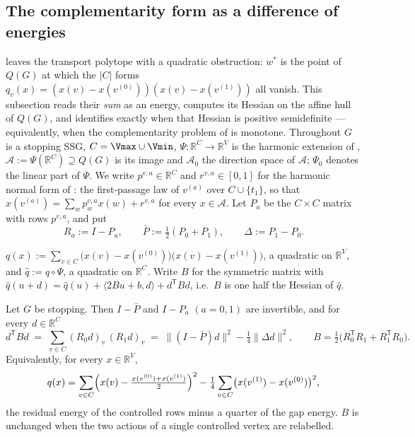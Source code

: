 
\subsection{The complementarity form as a difference of energies}\label{vr:sec}

 leaves the transport polytope with a
quadratic obstruction: $w^{\ast}$ is the point of $Q(G)$ at which the
$|C|$ forms $q_v(x)=(x(v)-x(v^{(0)}))(x(v)-x(v^{(1)}))$ all vanish. This
subsection reads their \emph{sum} as an energy, computes its Hessian on
the affine hull of $Q(G)$, and identifies exactly when that Hessian is
positive semidefinite --- equivalently, when the complementarity problem
of  is monotone. Throughout $G$ is a stopping SSG,
$C=\Vmax\cup\Vmin$, $\Psi\colon\mathbb R^{C}\to\mathbb R^{V}$ is the
harmonic extension of , $\mathcal A:=\Psi(\mathbb
R^{C})\supseteq Q(G)$ is its image and $\mathcal A_0$ the direction space
of $\mathcal A$; $\Psi_0$ denotes the linear part of $\Psi$. We write
$p^{v,a}\in\mathbb R^{C}$ and $r^{v,a}\in[0,1]$ for the harmonic normal
form of : the first-passage law of $v^{(a)}$ over
$C\cup\{t_1\}$, so that $x(v^{(a)})=\sum_{w}p^{v,a}_wx(w)+r^{v,a}$ for
every $x\in\mathcal A$. Let $P_a$ be the $C\times C$ matrix with rows
$p^{v,a}$, and put
\[
  R_a:=I-P_a,\qquad \bar P:=\tfrac12(P_0+P_1),\qquad \Delta:=P_1-P_0 .
\]

\begin{definition}\label{vr:def-form}
$q(x):=\sum_{v\in C}\bigl(x(v)-x(v^{(0)})\bigr)\bigl(x(v)-x(v^{(1)})\bigr)$,
a quadratic on $\mathbb R^{V}$, and $\widehat q:=q\circ\Psi$, a quadratic
on $\mathbb R^{C}$. Write $B$ for the symmetric matrix with
$\widehat q(u+d)=\widehat q(u)+\langle 2Bu+b,d\rangle+d^{\mathsf T}Bd$,
i.e.\ $B$ is one half the Hessian of $\widehat q$.
\end{definition}

\begin{lemma}\label{vr:hessian}
Let $G$ be stopping. Then $I-\bar P$ and $I-P_a$ $(a=0,1)$ are invertible,
and for every $d\in\mathbb R^{C}$
\[
  d^{\mathsf T}Bd
  \;=\;\sum_{v\in C}(R_0d)_v\,(R_1d)_v
  \;=\;\bigl\|(I-\bar P)d\bigr\|^{2}-\tfrac14\bigl\|\Delta d\bigr\|^{2},
  \qquad
  B=\tfrac12\bigl(R_0^{\mathsf T}R_1+R_1^{\mathsf T}R_0\bigr).
\]
Equivalently, for every $x\in\mathbb R^{V}$,
\[
  q(x)=\sum_{v\in C}\Bigl(x(v)-\tfrac{x(v^{(0)})+x(v^{(1)})}2\Bigr)^{2}
       -\tfrac14\sum_{v\in C}\bigl(x(v^{(1)})-x(v^{(0)})\bigr)^{2},
\]
the residual energy of the controlled rows minus a quarter of the gap
energy. $B$ is unchanged when the two actions of a single controlled
vertex are relabelled.
\end{lemma}

